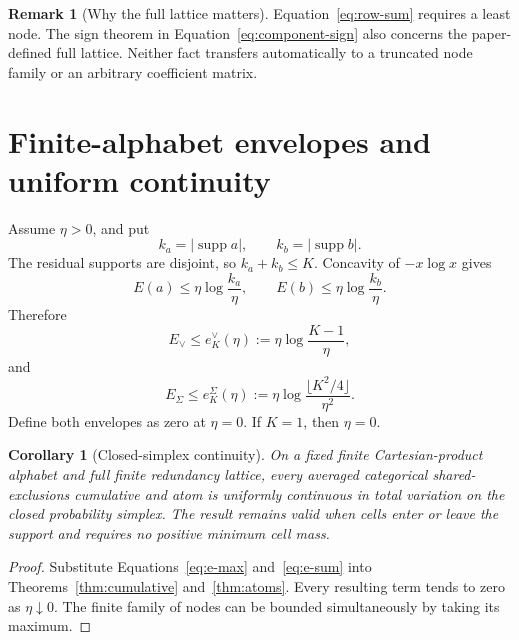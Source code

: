 \documentclass[11pt]{article}
\newtheorem{corollary}[theorem]{Corollary}
\theoremstyle{definition}
\newtheorem{remark}[theorem]{Remark}
\newcommand{\supp}{\operatorname{supp}}
\begin{document}
\begin{remark}[Why the full lattice matters]
Equation~\eqref{eq:row-sum} requires a least node.  The sign theorem in
Equation~\eqref{eq:component-sign} also concerns the paper-defined full lattice.  Neither fact
transfers automatically to a truncated node family or an arbitrary coefficient matrix.
\end{remark}

\section{Finite-alphabet envelopes and uniform continuity}

Assume \(\eta>0\), and put
\begin{equation}
  k_a=|\supp a|,
  \qquad
  k_b=|\supp b|.
\end{equation}
The residual supports are disjoint, so \(k_a+k_b\le K\).  Concavity of \(-x\log x\) gives
\begin{equation}
  E(a)\le\eta\log\frac{k_a}{\eta},
  \qquad
  E(b)\le\eta\log\frac{k_b}{\eta}.
\end{equation}
Therefore
\begin{equation}\label{eq:e-max}
  E_\vee
  \le
  e_K^\vee(\eta)
  :=
  \eta\log\frac{K-1}{\eta},
\end{equation}
and
\begin{equation}\label{eq:e-sum}
  E_\Sigma
  \le
  e_K^\Sigma(\eta)
  :=
  \eta\log\frac{\lfloor K^2/4\rfloor}{\eta^2}.
\end{equation}
Define both envelopes as zero at \(\eta=0\).  If \(K=1\), then \(\eta=0\).

\begin{corollary}[Closed-simplex continuity]\label{cor:continuity}
On a fixed finite Cartesian-product alphabet and full finite redundancy lattice, every averaged
categorical shared-exclusions cumulative and atom is uniformly continuous in total variation on
the closed probability simplex.  The result remains valid when cells enter or leave the support
and requires no positive minimum cell mass.
\end{corollary}

\begin{proof}
Substitute Equations~\eqref{eq:e-max} and~\eqref{eq:e-sum} into
Theorems~\ref{thm:cumulative} and~\ref{thm:atoms}.  Every resulting term tends to zero as
\(\eta\downarrow0\).  The finite family of nodes can be bounded simultaneously by taking its
maximum.
\end{proof}
\end{document}
